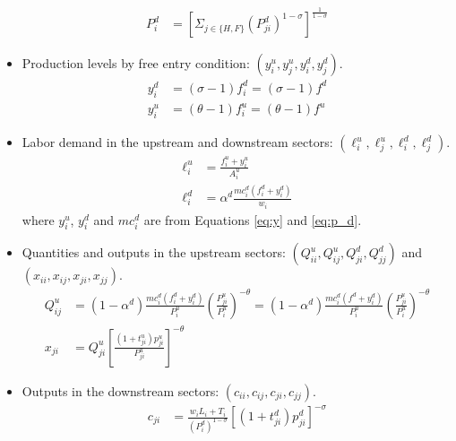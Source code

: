 \documentclass{homeworg}
\begin{document}
\begin{itemize}[ref=Step , wide=0pt]
\begin{equation}
\begin{aligned}
P^{d}_{i} &= [\Sigma_{j\in\{H, F\}}(P^{d}_{ji})^{1-\sigma}]^{\frac{1}{1-\sigma}}
\end{aligned}
\end{equation}
\item Production levels by free entry condition: $(y^{u}_{i}, y^{u}_{j}, y^{d}_{i}, y^{d}_{j})$.
\begin{equation}
\begin{aligned}
\label{eq:y}
y^{d}_{i} &= (\sigma-1)f^{d}_{i} = (\sigma-1)f^{d} \\
y^{u}_{i} &= (\theta-1)f^{u}_{i} = (\theta-1)f^{u}
\end{aligned}
\end{equation}
\item Labor demand in the upstream and downstream sectors: $(\ell^{u}_{i}, \ell^{u}_{j}, \ell^{d}_{i}, \ell^{d}_{j})$.
\begin{equation}
\begin{aligned}
\label{eq:l}
\ell^{u}_{i} &= \frac{f^{u}_{i}+y^{u}_{i}}{A^{u}_{i}} \\
\ell^{d}_{i} &= \alpha^{d}\frac{mc^{d}_{i}(f^{d}_{i}+y^{d}_{i})}{w_{i}}
\end{aligned}
\end{equation}
where $y^{u}_{i}$, $y^{d}_{i}$ and $mc^{d}_{i}$ are from Equations \ref{eq:y} and \ref{eq:p_d}.
\item Quantities and outputs in the upstream sectors: $(Q^{u}_{ii}, Q^{u}_{ij}, Q^{d}_{ji}, Q^{d}_{jj})$ and $(x_{ii}, x_{ij}, x_{ji}, x_{jj})$.
\begin{equation}
\begin{aligned}
\label{eq:Q,x}
Q^{u}_{ij} &= (1-\alpha^{d})\frac{mc^{d}_{i}(f^{d}_{i}+y^{d}_{i})}{P^{u}_{i}}(\frac{P^{u}_{ji}}{P^{u}_{i}})^{-\theta} = (1-\alpha^{d})\frac{mc^{d}_{i}(f^{d}+y^{d}_{i})}{P^{u}_{i}}(\frac{P^{u}_{ji}}{P^{u}_{i}})^{-\theta} \\
x_{ji} &= Q^{u}_{ji}[\frac{(1+t^{u}_{ji})p^{u}_{ji}}{P^{u}_{ji}}]^{-\theta}
\end{aligned}
\end{equation}
\item Outputs in the downstream sectors: $(c_{ii}, c_{ij}, c_{ji}, c_{jj})$.
\begin{equation}
\begin{aligned}
\label{eq:c}
c_{ji} &= \frac{w_{i}L_{i}+T_{i}}{(P^{d}_{i})^{1-\sigma}}[(1+t^{d}_{ji})p^{d}_{ji}]^{-\sigma}
\end{aligned}
\end{equation}
\end{itemize}
\end{document}
